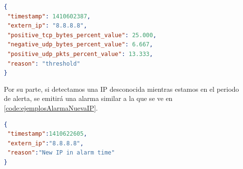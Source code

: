\begin{lstlisting}[language=json,caption={Ejemplo de alarma por umbral superado}, breaklines=true, 
label=code:ejemplosAlarmaUmbral,float=htbp,basicstyle=\scriptsize,captionpos=b]
{
 "timestamp": 1410602387, 
 "extern_ip": "8.8.8.8", 
 "positive_tcp_bytes_percent_value": 25.000,
 "negative_udp_bytes_percent_value": 6.667, 
 "positive_udp_pkts_percent_value": 13.333, 
 "reason": "threshold"
}
\end{lstlisting}

Por su parte, si detectamos una IP desconocida mientras estamos en el periodo de alerta,
se emitirá una alarma similar a la que se ve en \autoref{code:ejemplosAlarmaNuevaIP}.

\begin{lstlisting}[language=json,caption={Ejemplo de alarma por nueva IP}, breaklines=true, 
label=code:ejemplosAlarmaNuevaIP,float=htbp,captionpos=b,basicstyle=\scriptsize]
{
 "timestamp":1410622605,
 "extern_ip":"8.8.8.8",
 "reason":"New IP in alarm time"
}
\end{lstlisting}

\endinput
